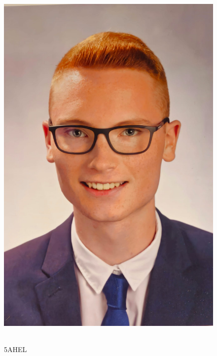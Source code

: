 \begin{figure}[h]
  \centering
  \begin{adjustbox}{valign=c}
    \includegraphics[scale=0.09]{image/Bellai.jpeg}
  \end{adjustbox}
  \hfill
  \begin{minipage}[b]{0.7\textwidth}
    \textbf{\nameSB} \\ 5AHEL
  \end{minipage}
  \captionsetup{justification=raggedright,singlelinecheck=false}
  \caption{\nameSB}
\end{figure}
\newpage
